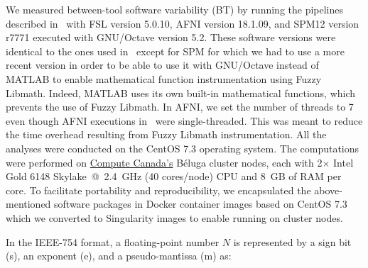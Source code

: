 \documentclass[11pt,onecolumn]{article}
\begin{document}
We measured between-tool software variability (BT) by running the pipelines
described in~\cite{bowring2019exploring} with FSL version 5.0.10, AFNI
version 18.1.09, and SPM12 version r7771 executed with GNU/Octave version
5.2. These software versions were identical to the ones used 
in~\cite{bowring2019exploring} except for SPM for which we had to use
a more recent version in order to be able to use it with GNU/Octave
instead of MATLAB to enable mathematical function instrumentation using
Fuzzy Libmath. Indeed, MATLAB uses its own built-in mathematical functions,
which prevents the use of Fuzzy Libmath. In AFNI, we set the number of
threads to 7 even though AFNI executions
in~\cite{bowring2019exploring} were single-threaded. This was meant to
reduce the time overhead resulting from Fuzzy Libmath instrumentation.
All the analyses were conducted on the CentOS 7.3 operating system. The
computations were performed on \href{https://www.computecanada.ca}{Compute
  Canada's} Béluga cluster nodes, each with 2$\times$ Intel Gold 6148 Skylake~@~2.4~GHz
(40 cores/node) CPU and 8~GB of RAM per core. To facilitate portability and reproducibility,
we encapsulated the
above-mentioned software packages in Docker container images based on CentOS 7.3
which we converted to Singularity images to enable running on cluster nodes.


In the IEEE-754 format, a floating-point number $N$ is represented by a sign
bit (s), an exponent (e), and a pseudo-mantissa (m) as:
\end{document}
